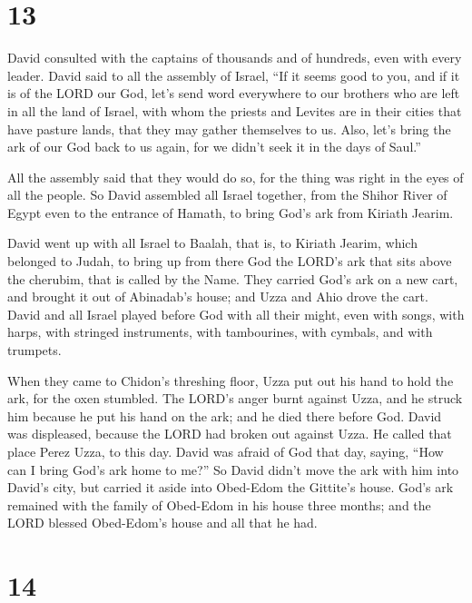 \hypertarget{section-12}{%
\section{13}\label{section-12}}

 David consulted with the captains of thousands and of
hundreds, even with every leader.  David said to all the
assembly of Israel, ``If it seems good to you, and if it is of the LORD
our God, let's send word everywhere to our brothers who are left in all
the land of Israel, with whom the priests and Levites are in their
cities that have pasture lands, that they may gather themselves to us.
 Also, let's bring the ark of our God back to us again, for
we didn't seek it in the days of Saul.''

 All the assembly said that they would do so, for the thing
was right in the eyes of all the people.  So David assembled
all Israel together, from the Shihor River of Egypt even to the entrance
of Hamath, to bring God's ark from Kiriath Jearim.

 David went up with all Israel to Baalah, that is, to
Kiriath Jearim, which belonged to Judah, to bring up from there God the
LORD's ark that sits above the cherubim, that is called by the Name.
 They carried God's ark on a new cart, and brought it out of
Abinadab's house; and Uzza and Ahio drove the cart.  David
and all Israel played before God with all their might, even with songs,
with harps, with stringed instruments, with tambourines, with cymbals,
and with trumpets.

 When they came to Chidon's threshing floor, Uzza put out
his hand to hold the ark, for the oxen stumbled.  The
LORD's anger burnt against Uzza, and he struck him because he put his
hand on the ark; and he died there before God.  David was
displeased, because the LORD had broken out against Uzza. He called that
place Perez Uzza, to this day.  David was afraid of God
that day, saying, ``How can I bring God's ark home to me?''
 So David didn't move the ark with him into David's city,
but carried it aside into Obed-Edom the Gittite's house. 
God's ark remained with the family of Obed-Edom in his house three
months; and the LORD blessed Obed-Edom's house and all that he had.

\hypertarget{section-13}{%
\section{14}\label{section-13}}

